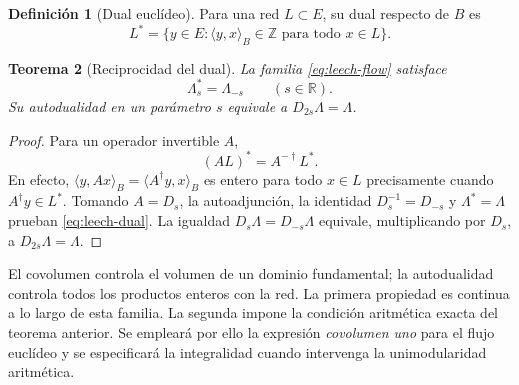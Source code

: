 \documentclass[a4paper,10pt]{article}
\newtheorem{theorem}{Teorema}[section]
\theoremstyle{definition}\newtheorem{definition}[theorem]{Definición}
\theoremstyle{remark}\newtheorem{remark}[theorem]{Observación}
\numberwithin{equation}{section}
\begin{document}
\begin{definition}[Dual euclídeo]
Para una red \(L\subset E\), su dual respecto de \(B\) es
\[
 L^*=\{y\in E:\langle y,x\rangle_B\in\mathbb Z
                         \text{ para todo }x\in L\}.
\]
\end{definition}

\begin{theorem}[Reciprocidad del dual]
\label{thm:leech-dual}
La familia \eqref{eq:leech-flow} satisface
\begin{equation}
 \Lambda_s^*=\Lambda_{-s}\qquad(s\in\mathbb R).
 \label{eq:leech-dual}
\end{equation}
Su autodualidad en un parámetro \(s\) equivale a
\(D_{2s}\Lambda=\Lambda\).
\end{theorem}
\begin{proof}
Para un operador invertible \(A\),
\[
 (AL)^*=A^{-\dagger}L^*.
\]
En efecto, \(\langle y,Ax\rangle_B=\langle A^\dagger y,x\rangle_B\)
es entero para todo \(x\in L\) precisamente cuando
\(A^\dagger y\in L^*\). Tomando \(A=D_s\), la autoadjunción,
la identidad \(D_s^{-1}=D_{-s}\) y \(\Lambda^*=\Lambda\) prueban
\eqref{eq:leech-dual}. La igualdad
\(D_s\Lambda=D_{-s}\Lambda\) equivale, multiplicando por \(D_s\),
a \(D_{2s}\Lambda=\Lambda\).
\end{proof}

El covolumen controla el volumen de un dominio fundamental; la
autodualidad controla todos los productos enteros con la red.
La primera propiedad es continua a lo largo de esta familia. La
segunda impone la condición aritmética exacta del teorema anterior.
Se empleará por ello la expresión \emph{covolumen uno} para el
flujo euclídeo y se especificará la integralidad cuando intervenga
la unimodularidad aritmética.
\end{document}

